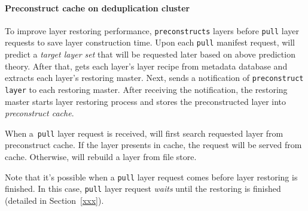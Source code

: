 

\paragraph{Preconstruct cache on deduplication cluster}
%
To improve layer restoring performance,
\sysname \texttt{preconstructs} layers before \texttt{pull} layer requests to save layer construction time.
Upon each \texttt{pull} manifest request,
\sysname will predict a \emph{target layer set} that will be requested later based on above prediction theory.
%
After that,
\sysname gets each layer's layer recipe from metadata database
and extracts each layer's restoring master.
Next,
\sysname sends a notification of \texttt{preconstruct layer} to
each restoring master.
After receiving the notification, 
the restoring master starts layer restoring process and stores the preconstructed layer into \emph{preconstruct cache}.

When a~\texttt{pull} layer request is received, 
\sysname will first search requested layer from preconstruct cache.
If the layer presents in cache, the request will be served from cache.
Otherwise,
\sysname will rebuild a layer from file store.

Note that it's possible when a \texttt{pull} layer request comes 
before layer restoring is finished.
In this case, \texttt{pull} layer request \emph{waits} until the restoring is finished
(detailed in Section~\ref{xxx}).
 



